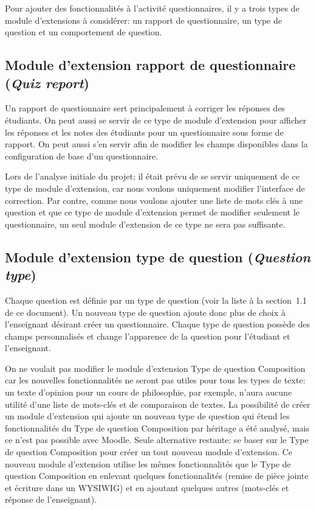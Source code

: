 Pour ajouter des fonctionnalités à l'activité questionnaires, il y a trois types de module d'extensions à considérer: un rapport de questionnaire, un type de question et un comportement de question.

\subsection{Module d'extension rapport de questionnaire (\textit{Quiz report})}

Un rapport de questionnaire sert principalement à corriger les réponses des étudiants.
On peut aussi se servir de ce type de module d'extension pour afficher les réponses et les notes des étudiants pour un questionnaire sous forme de rapport.
On peut aussi s'en servir afin de modifier les champs disponibles dans la configuration de base d'un questionnaire.

Lors de l'analyse initiale du projet; il était prévu de se servir uniquement de ce type de module d'extension, car nous voulons uniquement modifier l'interface de correction.
Par contre, comme nous voulons ajouter une liste de mots clés à une question et que ce type de module d'extension permet de modifier seulement le questionnaire, un seul module d'extension de ce type ne sera pas suffisante.

\subsection{Module d'extension type de question (\textit{Question type})}

Chaque question est définie par un type de question (voir la liste à la section~1.1 de ce document).
Un nouveau type de question ajoute donc plus de choix à l'enseignant désirant créer un questionnaire.
Chaque type de question possède des champs personnalisés et change l'apparence de la question pour l'étudiant et l'enseignant.

On ne voulait pas modifier le module d'extension \og Type de question Composition \fg{} car les nouvelles fonctionnalités ne seront pas utiles pour tous les types de texte: un texte d'opinion pour un cours de philosophie, par exemple, n'aura aucune utilité d'une liste de mots-clés et de comparaison de textes.
La possibilité de créer un module d'extension qui ajoute un nouveau type de question qui étend les fonctionnalités du \og Type de question Composition \fg{} par héritage a été analysé, mais ce n'est pas possible avec Moodle.
Seule alternative restante: se baser sur le \og Type de question Composition \fg{} pour créer un tout nouveau module d'extension.
Ce nouveau module d'extension utilise les mêmes fonctionnalités que le \og Type de question Composition \fg{} en enlevant quelques fonctionnalités (remise de pièce jointe et écriture dans un WYSIWIG) et en ajoutant quelques autres (mots-clés et réponse de l'enseignant).

